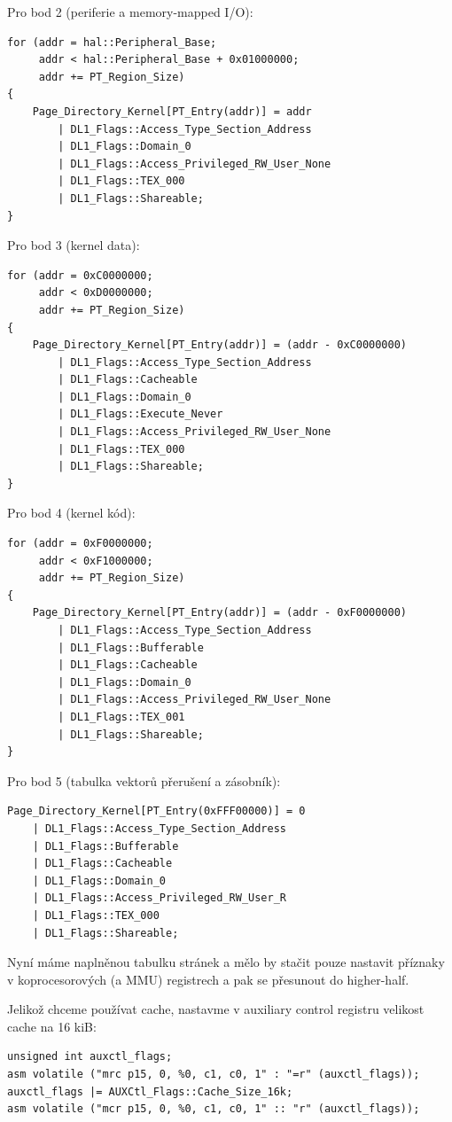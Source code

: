 \documentclass{article}
\begin{document}
Pro bod 2 (periferie a memory-mapped I/O):
\begin{lstlisting}
for (addr = hal::Peripheral_Base;
     addr < hal::Peripheral_Base + 0x01000000;
     addr += PT_Region_Size)
{
    Page_Directory_Kernel[PT_Entry(addr)] = addr
        | DL1_Flags::Access_Type_Section_Address
        | DL1_Flags::Domain_0
        | DL1_Flags::Access_Privileged_RW_User_None
        | DL1_Flags::TEX_000
        | DL1_Flags::Shareable;
}
\end{lstlisting}

Pro bod 3 (kernel data):
\begin{lstlisting}
for (addr = 0xC0000000;
     addr < 0xD0000000;
     addr += PT_Region_Size)
{
    Page_Directory_Kernel[PT_Entry(addr)] = (addr - 0xC0000000)
        | DL1_Flags::Access_Type_Section_Address
        | DL1_Flags::Cacheable
        | DL1_Flags::Domain_0
        | DL1_Flags::Execute_Never
        | DL1_Flags::Access_Privileged_RW_User_None
        | DL1_Flags::TEX_000
        | DL1_Flags::Shareable;
}
\end{lstlisting}

Pro bod 4 (kernel kód):
\begin{lstlisting}
for (addr = 0xF0000000;
     addr < 0xF1000000;
     addr += PT_Region_Size)
{
    Page_Directory_Kernel[PT_Entry(addr)] = (addr - 0xF0000000)
        | DL1_Flags::Access_Type_Section_Address
        | DL1_Flags::Bufferable
        | DL1_Flags::Cacheable
        | DL1_Flags::Domain_0
        | DL1_Flags::Access_Privileged_RW_User_None
        | DL1_Flags::TEX_001
        | DL1_Flags::Shareable;
}
\end{lstlisting}

Pro bod 5 (tabulka vektorů přerušení a zásobník):
\begin{lstlisting}
Page_Directory_Kernel[PT_Entry(0xFFF00000)] = 0
    | DL1_Flags::Access_Type_Section_Address
    | DL1_Flags::Bufferable
    | DL1_Flags::Cacheable
    | DL1_Flags::Domain_0
    | DL1_Flags::Access_Privileged_RW_User_R
    | DL1_Flags::TEX_000
    | DL1_Flags::Shareable;
\end{lstlisting}


Nyní máme naplněnou tabulku stránek a mělo by stačit pouze nastavit příznaky v koprocesorových (a MMU) registrech a pak se přesunout do higher-half.

Jelikož chceme používat cache, nastavme v auxiliary control registru velikost cache na 16 kiB:
\begin{lstlisting}
unsigned int auxctl_flags;
asm volatile ("mrc p15, 0, %0, c1, c0, 1" : "=r" (auxctl_flags));
auxctl_flags |= AUXCtl_Flags::Cache_Size_16k;
asm volatile ("mcr p15, 0, %0, c1, c0, 1" :: "r" (auxctl_flags));
\end{lstlisting}
\end{document}
